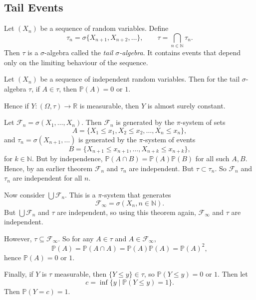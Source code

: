 \documentclass[12pt]{article}
\begin{document}
\subsection{Tail Events}
\label{sub:tail_evs}

Let $(X_n)$ be a sequence of random variables. Define
\[
\tau_n = \sigma\{X_{n+1}, X_{n+2}, \ldots\}, \qquad \tau = \bigcap_{n \in \mathbb{N}} \tau_n.
\]
Then $\tau$ is a $\sigma$-algebra called the \emph{tail $\sigma$-algebra}. It contains events that depend only on the limiting behaviour of the sequence.

\begin{theorem}
	Let $(X_n)$ be a sequence of independent random variables. Then for the tail $\sigma$-algebra $\tau$, if $A \in \tau$, then $\mathbb{P}(A) = 0$ or $1$.

	Hence if $Y : (\Omega, \tau) \to \mathbb{R}$ is measurable, then $Y$ is almost surely constant.
\end{theorem}

\begin{proofbox}
	Let $\mathcal{F}_n = \sigma(X_1, \ldots, X_n)$. Then $\mathcal{F}_n$ is generated by the $\pi$-system of sets
	\[
		A = \{X_1 \leq x_1, X_2 \leq x_2, \ldots, X_n \leq x_n\},
	\]
	and $\tau_n = \sigma(X_{n+1}, \ldots)$ is generated by the $\pi$-system of events
	\[
		B = \{X_{n+1} \leq x_{n+1}, \ldots, X_{n+k} \leq x_{n+k}\},
	\]
	for $k \in \mathbb{N}$. But by independence, $\mathbb{P}(A \cap B) = \mathbb{P}(A) \mathbb{P}(B)$ for all such $A, B$. Hence, by an earlier theorem $\mathcal{F}_n$ and $\tau_n$ are independent. But $\tau \subset \tau_n$. So $\mathcal{F}_n$ and $\tau_n$ are independent for all $n$.

	Now consider $\bigcup \mathcal{F}_n$. This is a $\pi$-system that generates
	\[
	\mathcal{F}_{\infty} = \sigma(X_n, n \in \mathbb{N}).
	\]
	But $\bigcup \mathcal{F}_n$ and $\tau$ are independent, so using this theorem again, $\mathcal{F}_{\infty}$ and $\tau$ are independent.

	However, $\tau \subseteq \mathcal{F}_{\infty}$. So for any $A \in \tau$ and $A \in \mathcal{F}_{\infty}$,
	\[
	\mathbb{P}(A) = \mathbb{P}(A \cap A) = \mathbb{P}(A)\mathbb{P}(A) = \mathbb{P}(A)^2,
	\]
	hence $\mathbb{P}(A) = 0$ or $1$.

	Finally, if $Y$ is $\tau$ measurable, then $\{Y \leq y\} \in \tau$, so $\mathbb{P}(Y \leq y) = 0$ or $1$. Then let
	\[
		c = \inf\{y \mid \mathbb{P}(Y \leq y) = 1\}.
	\]
	Then $\mathbb{P}(Y = c) = 1$.
\end{proofbox}
\end{document}
